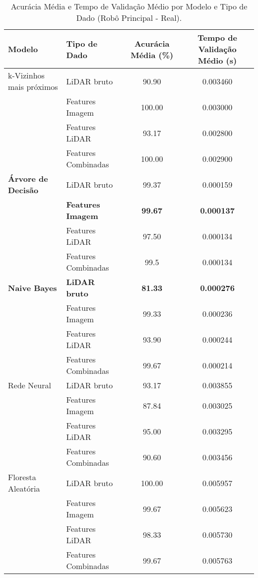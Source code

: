 \begin{table}[!ht]
\caption{Acurácia Média e Tempo de Validação Médio por Modelo e Tipo de Dado (Robô Principal - Real).}
\centering
\begin{tabular}{llcc}
\hline
\textbf{Modelo} & \textbf{Tipo de Dado} & \textbf{Acurácia Média (\%)} & \textbf{Tempo de Validação Médio (s)} \\
\hline
k-Vizinhos mais próximos & LiDAR bruto & 90.90 & 0.003460 \\
                         & Features Imagem & 100.00 & 0.003000 \\
                         & Features LiDAR & 93.17 & 0.002800 \\
                         & Features Combinadas & 100.00 & 0.002900 \\
\hline
\textbf{Árvore de Decisão}        & LiDAR bruto & 99.37 & 0.000159 \\
                         & \textbf{Features Imagem} & \textbf{99.67} & \textbf{0.000137} \\
                         & Features LiDAR & 97.50 & 0.000134 \\
                         & Features Combinadas & 99.5 & 0.000134 \\ 
\hline
\textbf{Naive Bayes}     & \textbf{LiDAR bruto} & \textbf{81.33} & \textbf{0.000276} \\
                         & Features Imagem & 99.33 & 0.000236 \\
                         & Features LiDAR & 93.90 & 0.000244 \\
                         & Features Combinadas & 99.67 & 0.000214 \\
\hline
Rede Neural              & LiDAR bruto & 93.17 & 0.003855 \\
                         & Features Imagem & 87.84 & 0.003025 \\
                         & Features LiDAR & 95.00 & 0.003295 \\
                         & Features Combinadas & 90.60 & 0.003456 \\
\hline
Floresta Aleatória       & LiDAR bruto & 100.00 & 0.005957 \\
                         & Features Imagem & 99.67 & 0.005623 \\
                         & Features LiDAR & 98.33 & 0.005730 \\
                         & Features Combinadas & 99.67 & 0.005763 \\
\hline
\end{tabular}
\label{tab:resumo_principal_real_tipodado}
\end{table}

